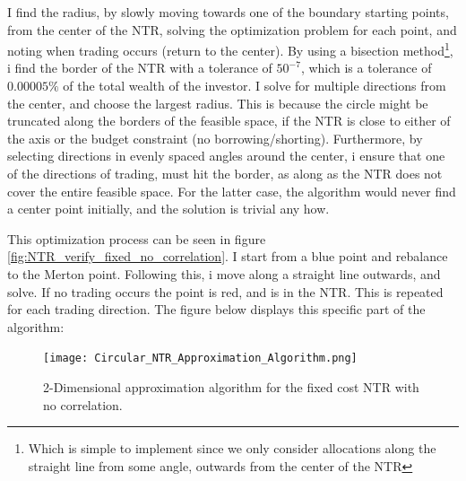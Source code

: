 \documentclass[11pt]{article}
\begin{document}
I find the radius, by slowly moving towards one of the boundary starting points, from the center of the NTR, solving the optimization problem for each point,
and noting when trading occurs (return to the center). By using a bisection method\footnote{Which is simple to implement since we only consider allocations along the straight line from some angle, outwards from the center of the NTR},
i find the border of the \ac{NTR} with a tolerance of $50^{-7}$,
which is a tolerance of $0.00005\%$ of the total wealth of the investor. I solve for multiple directions from the center, and choose the largest radius. This is because the circle might be truncated along the borders of the feasible space,
if the NTR is close to either of the axis or the budget constraint (no borrowing/shorting).
Furthermore, by selecting directions in evenly spaced angles around the center, i ensure that one of the directions of trading, must hit the border, as along as the \ac{NTR} does not cover the entire feasible space.
For the latter case, the algorithm would never find a center point initially, and the solution is trivial any how.

This optimization process can be seen in figure \ref{fig:NTR_verify_fixed_no_correlation}. I start from a blue point and rebalance to the Merton point.
Following this, i move along a straight line outwards, and solve. If no trading occurs the point is red, and is in the \ac{NTR}. 
This is repeated for each trading direction. The figure below displays this specific part of the algorithm:
\begin{figure}[!ht]
    \centering
    \texttt{[image: Circular\_NTR\_Approximation\_Algorithm.png]}
    \caption{2-Dimensional approximation algorithm for the fixed cost NTR with no correlation.}
    \label{fig:FixedCost_NTR_Approximation}
\end{figure}
\end{document}
